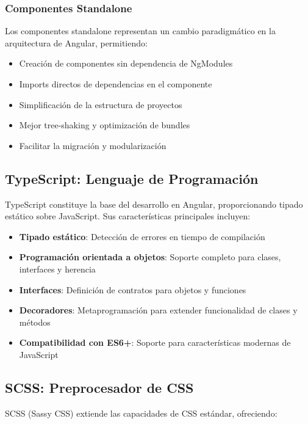 \subsubsection{Componentes Standalone}

Los componentes standalone representan un cambio paradigmático en la arquitectura de Angular, permitiendo:

\begin{itemize}
    \item Creación de componentes sin dependencia de NgModules
    \item Imports directos de dependencias en el componente
    \item Simplificación de la estructura de proyectos
    \item Mejor tree-shaking y optimización de bundles
    \item Facilitar la migración y modularización
\end{itemize}

\subsection{TypeScript: Lenguaje de Programación}

TypeScript constituye la base del desarrollo en Angular, proporcionando tipado estático sobre JavaScript. Sus características principales incluyen:

\begin{itemize}
    \item \textbf{Tipado estático}: Detección de errores en tiempo de compilación
    \item \textbf{Programación orientada a objetos}: Soporte completo para clases, interfaces y herencia
    \item \textbf{Interfaces}: Definición de contratos para objetos y funciones
    \item \textbf{Decoradores}: Metaprogramación para extender funcionalidad de clases y métodos
    \item \textbf{Compatibilidad con ES6+}: Soporte para características modernas de JavaScript
\end{itemize}

\subsection{SCSS: Preprocesador de CSS}

SCSS (Sassy CSS) extiende las capacidades de CSS estándar, ofreciendo:

